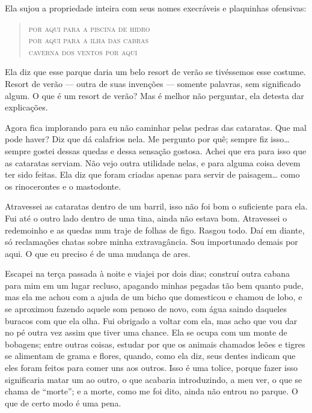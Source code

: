   Ela sujou a propriedade inteira com seus nomes execráveis e
plaquinhas ofensivas:  

\begin{verse}
\quad\textsc{por aqui para a piscina de hidro}\\
\quad\textsc{por aqui para a ilha das cabras}\\
\quad\textsc{caverna dos ventos por aqui}
\end{verse}

Ela diz que esse parque daria um belo resort de verão se tivéssemos esse
costume. Resort de verão --- outra de suas invenções --- somente palavras, sem
significado algum. O que é um resort de verão? Mas é melhor não perguntar, 
ela detesta dar explicações.

  Agora fica implorando para eu não caminhar pelas pedras das
cataratas. Que mal pode haver? Diz que dá calafrios nela. Me pergunto por quê;
sempre fiz isso\ldots{} sempre gostei dessas quedas e dessa sensação gostosa. Achei
que era para isso que as cataratas serviam. Não vejo outra utilidade nelas, e
para alguma coisa devem ter sido feitas. Ela diz que foram criadas apenas para
servir de paisagem\ldots{} como os rinocerontes e o mastodonte. 

Atravessei as cataratas dentro de um barril, isso não foi bom o suficiente para
ela. Fui até o outro lado dentro de uma tina, ainda não estava bom.
Atravessei o redemoinho e as quedas num traje de folhas de figo. Rasgou todo.
Daí em diante, só reclamações chatas sobre minha extravagância. 
Sou importunado demais por aqui. O que eu preciso é de uma mudança de ares.

  Escapei na terça passada à noite e viajei por dois dias; construí outra
cabana para mim em um lugar recluso, apagando minhas pegadas tão bem quanto
pude, mas ela me achou com a ajuda de um bicho que domesticou e chamou de
lobo, e se aproximou fazendo aquele som penoso de novo, com água saindo
daqueles buracos com que ela olha. Fui obrigado a voltar com ela, mas acho que
vou dar no pé outra vez assim que tiver uma chance. Ela se ocupa com um monte de
bobagens; entre outras coisas, estudar por que os animais chamados leões e tigres se
alimentam de grama e flores, quando, como ela diz, seus dentes indicam que
eles foram feitos para comer uns aos outros. Isso é uma tolice, porque fazer
isso significaria matar um ao outro, o que acabaria introduzindo, a meu ver, o
que se chama de “morte”; e a morte, como me foi dito, ainda não entrou no
parque. O que de certo modo é uma pena. 


